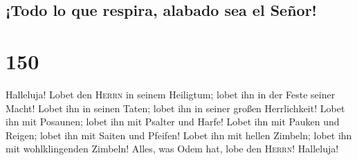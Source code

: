 \hypertarget{todo-lo-que-respira-alabado-sea-el-seuxf1or}{%
\subsection{¡Todo lo que respira, alabado sea el
Señor!}\label{todo-lo-que-respira-alabado-sea-el-seuxf1or}}

\hypertarget{section-149}{%
\section{150}\label{section-149}}

 Halleluja! Lobet den \textsc{Herrn} in seinem Heiligtum;
lobet ihn in der Feste seiner Macht!  Lobet ihn in seinen
Taten; lobet ihn in seiner großen Herrlichkeit!  Lobet ihn
mit Posaunen; lobet ihn mit Psalter und Harfe!  Lobet ihn
mit Pauken und Reigen; lobet ihn mit Saiten und Pfeifen! 
Lobet ihn mit hellen Zimbeln; lobet ihn mit wohlklingenden Zimbeln!
 Alles, was Odem hat, lobe den \textsc{Herrn}! Halleluja!
